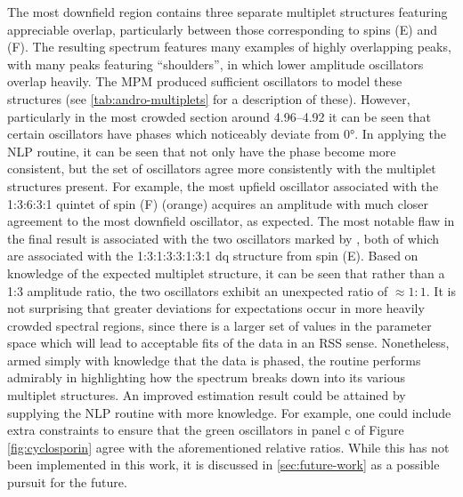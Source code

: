 The most downfield region contains three separate multiplet structures
featuring appreciable overlap, particularly between those corresponding to
spins (E) and (F).
The resulting spectrum features many examples of highly overlapping peaks, with
many peaks featuring ``shoulders'', in which lower amplitude oscillators
overlap heavily.
The \ac{MPM} produced sufficient oscillators to model these
structures (see \cref{tab:andro-multiplets} for a description of these).
However, particularly in the most crowded section around
\SIrange{4.96}{4.92}{\partspermillion} it can be seen that certain oscillators
have phases which noticeably deviate from \ang{0}. In applying the \ac{NLP}
routine, it can be seen that not only have the phase become more consistent,
but the set of oscillators agree more consistently with the multiplet
structures present. For example, the most upfield oscillator associated with
the 1:3:6:3:1 quintet of spin (F) (orange) acquires an amplitude with much
closer agreement to the most downfield oscillator, as expected. The most
notable flaw in the final result is associated with the two oscillators marked
by \textdagger, both of which are associated with the 1:3:1:3:3:1:3:1 dq
structure from spin (E). Based on knowledge of the expected multiplet
structure, it can be seen that rather than a 1:3 amplitude ratio, the two
oscillators exhibit an unexpected ratio of $\approx 1:1$. It is not surprising
that greater deviations for expectations occur in more heavily crowded spectral
regions, since there is a larger set of values in the parameter space which
will lead to acceptable fits of the data in an \ac{RSS} sense. Nonetheless,
armed simply with knowledge that the data is phased, the routine performs
admirably in highlighting  how the spectrum breaks down into its various
multiplet structures. An improved estimation result could be attained by
supplying the \ac{NLP} routine with more knowledge. For example, one could
include extra constraints to ensure that the green oscillators in panel c of
Figure \ref{fig:cyclosporin} agree with the aforementioned relative ratios.
While this has not been implemented in this work, it is discussed in
\cref{sec:future-work} as a possible pursuit for the future.

